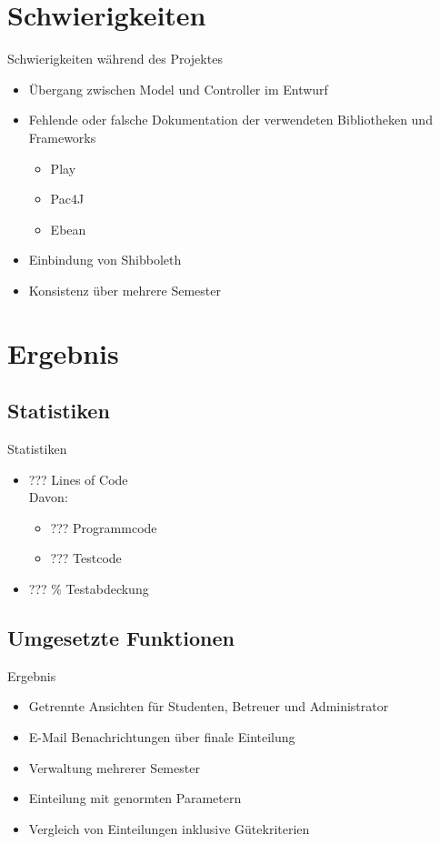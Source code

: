 \documentclass[18pt]{beamer}
\begin{document}
\section{Schwierigkeiten}
\begin{frame}{Schwierigkeiten während des Projektes}
\begin{itemize}
\item Übergang zwischen Model und Controller im Entwurf
\item Fehlende oder falsche Dokumentation der verwendeten Bibliotheken
und Frameworks
\begin{itemize}
\item Play
\item Pac4J
\item Ebean
\end{itemize}
\item Einbindung von Shibboleth
\item Konsistenz über mehrere Semester
\end{itemize}
\end{frame}

\section{Ergebnis}
\subsection{Statistiken}
\begin{frame}{Statistiken}
\begin{itemize}
\item ??? Lines of Code \\ Davon:
\begin{itemize}
\item ??? Programmcode
\item ??? Testcode
\end{itemize}
\item ??? \% Testabdeckung
\end{itemize} 
\end{frame}

\subsection{Umgesetzte Funktionen}
\begin{frame}{Ergebnis} 
\begin{itemize}
 \item Getrennte Ansichten für Studenten, Betreuer und Administrator
 \item E-Mail Benachrichtungen über finale Einteilung
 \item Verwaltung mehrerer Semester
 \item Einteilung mit genormten Parametern
 \item Vergleich von Einteilungen inklusive Gütekriterien
\end{itemize}
\end{frame}
\end{document}
